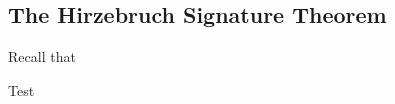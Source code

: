 %
%
\subsection{The Hirzebruch Signature Theorem}

Recall that
%
%
\begin{definition}
  Test
\end{definition}

